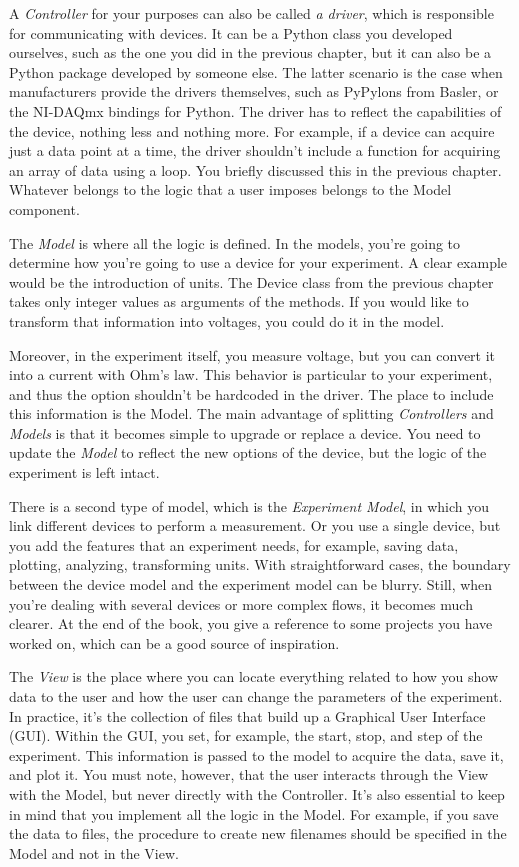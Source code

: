 A \emph{Controller} for your purposes can also be called \emph{a driver}, which is responsible for communicating with devices. It can be a Python class you developed ourselves, such as the one you did in the previous chapter, but it can also be a Python package developed by someone else. The latter scenario is the case when manufacturers provide the drivers themselves, such as PyPylons from Basler, or the NI-DAQmx bindings for Python. The driver has to reflect the capabilities of the device, nothing less and nothing more. For example, if a device can acquire just a data point at a time, the driver shouldn't include a function for acquiring an array of data using a loop. You briefly discussed this in the previous chapter. Whatever belongs to the logic that a user imposes belongs to the Model component.

The \emph{Model} is where all the logic is defined. In the models, you're going to determine how you're going to use a device for your experiment. A clear example would be the introduction of units. The Device class from the previous chapter takes only integer values as arguments of the methods. If you would like to transform that information into voltages, you could do it in the model.

Moreover, in the experiment itself, you measure voltage, but you can convert it into a current with Ohm's law. This behavior is particular to your experiment, and thus the option shouldn't be hardcoded in the driver. The place to include this information is the Model. The main advantage of splitting \emph{Controllers} and \emph{Models} is that it becomes simple to upgrade or replace a device. You need to update the \emph{Model} to reflect the new options of the device, but the logic of the experiment is left intact.

There is a second type of model, which is the \emph{Experiment Model}, in which you link different devices to perform a measurement. Or you use a single device, but you add the features that an experiment needs, for example, saving data, plotting, analyzing, transforming units. With straightforward cases, the boundary between the device model and the experiment model can be blurry. Still, when you're dealing with several devices or more complex flows, it becomes much clearer. At the end of the book, you give a reference to some projects you have worked on, which can be a good source of inspiration.

The \emph{View} is the place where you can locate everything related to how you show data to the user and how the user can change the parameters of the experiment. In practice, it's the collection of files that build up a Graphical User Interface ({GUI}). Within the {GUI}, you set, for example, the start, stop, and step of the experiment. This information is passed to the model to acquire the data, save it, and plot it. You must note, however, that the user interacts through the View with the Model, but never directly with the Controller. It's also essential to keep in mind that you implement all the logic in the Model. For example, if you save the data to files, the procedure to create new filenames should be specified in the Model and not in the View.

